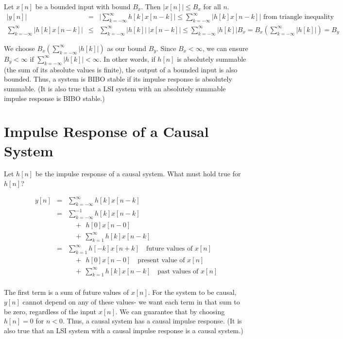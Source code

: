\documentclass[11pt]{article}
\begin{document}
{\color{blue}
Let $x[n]$ be a bounded input with bound $B_x$. Then $|x[n]| \leq B_x$ for all $n$.
\begin{eqnarray*}
|y[n]| &=& \big|\sum\limits_{k=-\infty}^\infty h[k]x[n-k]\big|
\leq  \sum\limits_{k=-\infty}^\infty \big| h[k]x[n-k]\big| \text{ from triangle inequality} \\
\sum\limits_{k=-\infty}^\infty \big| h[k]x[n-k]\big| &\leq & \sum\limits_{k=-\infty}^\infty \big| h[k]\big|\ \big|x[n-k]\big| \leq  \sum\limits_{k=-\infty}^\infty \big| h[k]\big|  B_x = B_x \left(\sum\limits_{k=-\infty}^\infty \big| h[k]\big| \right) = B_y
\end{eqnarray*}

We choose $B_x \left(\sum\limits_{k=-\infty}^\infty \big| h[k]\big| \right)$ as our bound $B_y$. Since $B_x < \infty$, we can ensure $B_y < \infty$ if $\sum\limits_{k=-\infty}^\infty \big| h[k]\big| < \infty$. In other words, if $h[n]$ is absolutely summable (the sum of its absolute values is finite), the output of a bounded input is also bounded. Thus, a system is BIBO stable if its impulse response is absolutely summable. (It is also true that a LSI system with an absolutely summable impulse response is BIBO stable.)
}

\section{Impulse Response of a Causal System}
Let $h[n]$ be the impulse response of a causal system. What must hold true for $h[n]$?

{\color{blue}
\begin{eqnarray*}
y[n] &=& \sum\limits_{k=-\infty}^\infty h[k]x[n-k] \\
&=& \sum\limits_{k=-\infty}^{-1} h[k]x[n-k] \\
&& \quad +\ \ h[0]x[n-0] \\
&& \quad +\ \sum\limits_{k=1}^\infty h[k]x[n-k] \\
&=& \sum\limits_{k=1}^\infty h[-k]x[n+k] \quad \text{future values of $x[n]$} \\
&& \quad +\ \ h[0]x[n-0] \quad \text{present value of $x[n]$}\\
&& \quad +\ \sum\limits_{k=1}^\infty h[k]x[n-k] \quad \text{past values of $x[n]$}\\
\end{eqnarray*}

The first term is a sum of future values of $x[n]$. For the system to be causal, $y[n]$ cannot depend on any of these values- we want each term in that sum to be zero, regardless of the input $x[n]$. We can guarantee that by choosing $h[n] = 0$ for $n < 0$. Thus, a causal system has a causal impulse response. (It is also true that an LSI system with a causal impulse response is a causal system.)
}
\end{document}
